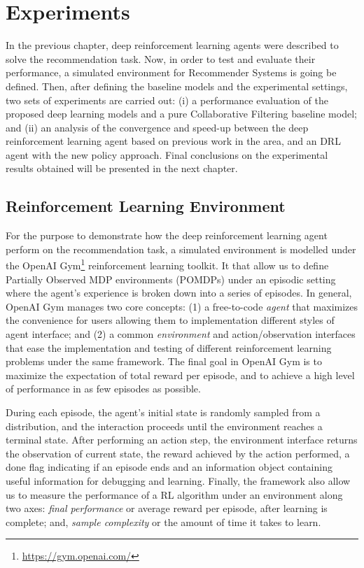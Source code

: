 \chapter{Experiments}
\label{sec:chapterlabel4}

In the previous chapter, deep reinforcement learning agents were described to solve the recommendation task. Now, in order to test and evaluate their performance, a simulated environment for Recommender Systems is going be defined. Then, after defining the baseline models and the experimental settings, two sets of experiments are carried out: (i) a performance evaluation of the proposed deep learning models and a pure Collaborative Filtering baseline model; and (ii) an analysis of the convergence and speed-up between the deep reinforcement learning agent based on previous work in the area, and an DRL agent with the new policy approach. Final conclusions on the experimental results obtained will be presented in the next chapter.

\section{Reinforcement Learning Environment}

For the purpose to demonstrate how the deep reinforcement learning agent perform on the recommendation task, a simulated environment is modelled under the OpenAI Gym\footnote{\url{https://gym.openai.com/}} reinforcement learning toolkit. It that allow us to define Partially Observed MDP environments (POMDPs)  under an episodic setting where the agent's experience is broken down into a series of episodes\cite{brockman2016openai}. In general, OpenAI Gym manages two core concepts: (1) a free-to-code \textit{agent} that maximizes the convenience for users allowing them to implementation different styles of agent interface; and (2) a common \textit{environment} and action/observation interfaces that ease the implementation and testing of different reinforcement learning problems under the same framework. The final goal in OpenAI Gym is to maximize the expectation of total reward per episode, and to achieve a high level of performance in as few episodes as possible.

During each episode, the agent's initial state is randomly sampled from a distribution, and the interaction proceeds until the environment reaches a terminal state. After performing an action step, the environment interface returns the observation of current state, the reward achieved by the action performed, a done flag indicating if an episode ends and an information object containing useful information for debugging and learning. Finally, the framework also allow us to measure the performance of a RL algorithm under an environment along two axes: \textit{final performance} or average reward per episode, after learning is complete; and, \textit{sample complexity} or the amount of time it takes to learn. 

